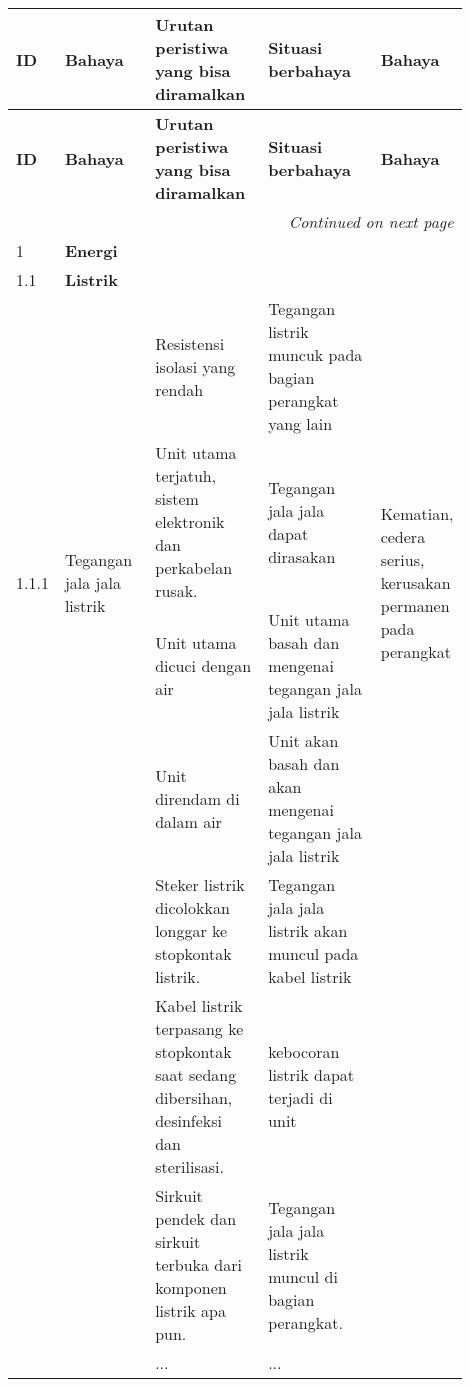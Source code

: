 \documentclass[11pt,a4paper,twoside,onecolumn]{book}
\begin{document}
			\begin{longtable}{p{0.05\linewidth} p{0.20\linewidth} p{0.25\linewidth} p{0.25\linewidth} p{0.15\linewidth}}
				\hline
				\cellcolor{yellow} \textbf{ID} & \cellcolor{yellow} \textbf{Bahaya} & \cellcolor{yellow} \textbf{Urutan peristiwa yang bisa diramalkan} & \cellcolor{yellow} \textbf{Situasi berbahaya} & \cellcolor{yellow} \textbf{Bahaya} \\
				\hline
				\endfirsthead
				\hline
				\cellcolor{yellow} \textbf{ID} & \cellcolor{yellow} \textbf{Bahaya} & \cellcolor{yellow} \textbf{Urutan peristiwa yang bisa diramalkan} & \cellcolor{yellow} \textbf{Situasi berbahaya} & \cellcolor{yellow} \textbf{Bahaya} \\
				\hline
				\endhead
				\hline
				\multicolumn{5}{r}{\textit{Continued on next page}} \\
				\endfoot
				\hline
				\endlastfoot
				
				\hline
				\hline
				\cellcolor{cyan} 1 & \multicolumn{4}{l}{\textbf{Energi} \cellcolor{cyan}}  \\
				\hline
				1.1 & \multicolumn{4}{l}{\textbf{Listrik}} \\
				\hline
				\multirow{4}{\linewidth}{1.1.1} & \multirow{4}{\linewidth}{Tegangan jala jala listrik} 	& Resistensi isolasi yang rendah & Tegangan listrik muncuk pada bagian perangkat yang lain & \multirow{4}{\linewidth}{Kematian, cedera serius, kerusakan permanen pada perangkat} \\\cline{3-4}
																  &	& Unit utama terjatuh, sistem elektronik dan perkabelan rusak. & Tegangan jala jala dapat dirasakan & \\ \cline{3-4}
																  &	& Unit utama dicuci dengan air & Unit utama basah dan  mengenai tegangan jala jala listrik & \\ \cline{3-4}
																  &	& Unit direndam di dalam air  & Unit akan basah dan akan mengenai tegangan jala jala listrik  & \\ \cline{3-4}
																  &	& Steker listrik dicolokkan longgar ke stopkontak listrik. & Tegangan jala jala listrik akan muncul pada kabel listrik  & \\ \cline{3-4}
										 						  &	& Kabel listrik terpasang ke stopkontak saat sedang  dibersihan, desinfeksi dan sterilisasi.  & kebocoran listrik dapat terjadi di unit  & \\ \cline{3-4}
										 						  &	& Sirkuit pendek dan sirkuit terbuka dari komponen listrik apa pun. & Tegangan jala jala listrik muncul di bagian perangkat. & \\ \cline{3-4}
										 						  &	& ... & ... & \\ \cline{1-5}
				

\end{longtable}
\end{document}

